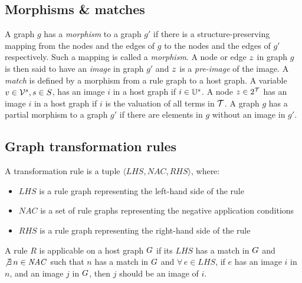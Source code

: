 \subsection{Morphisms \& matches}
A graph $g$ has a \textit{morphism} to a graph $g'$ if there is a structure-preserving mapping from the nodes and the edges of $g$ to the nodes and the edges of $g'$ respectively. Such a mapping is called a \textit{morphism}. A node or edge $z$ in graph $g$ is then said to have an \textit{image} in graph $g'$ and $z$ is a \textit{pre-image} of the image. A \textit{match} is defined by a morphism from a rule graph to a host graph. A variable $v \in \mathcal{V}^{s}, s \in S$, has an image $i$ in a host graph if $i \in \mathbb{U}^{s}$. A node $z \in 2^{\mathcal{T}}$ has an image $i$ in a host graph if $i$ is the valuation of all terms in $\mathcal{T}$. A graph $g$ has a partial morphism to a graph $g'$ if there are elements in $g$ without an image in $g'$.

\subsection{Graph transformation rules}\label{sec:graph_rules}
\vspace{5px}
\begin{definition}
A transformation rule is a tuple $\langle \mathit{LHS}, \mathit{NAC}, \mathit{RHS}\rangle$, where:
\begin{itemize}
  \item $\mathit{LHS}$ is a rule graph representing the left-hand side of the rule
  \item $\mathit{NAC}$ is a set of rule graphs representing the negative application conditions
  \item $\mathit{RHS}$ is a rule graph representing the right-hand side of the rule
\end{itemize}
\end{definition}

\begin{comment}\begin{definition}
$\mathit{LHS}$ is a tuple $\langle \mathcal{V}_{LHS}, \mathcal{E}_{LHS}, \mathcal{O}_{LHS} \rangle$, where $\mathcal{O}_{LHS} \subseteq \mathcal{V}^n \times O_p \times \mathcal{V}$.
\end{definition}\end{comment}

A rule $R$ is applicable on a host graph $G$ if its $\mathit{LHS}$ has a match in $G$ and $\not\exists\,n \in \mathit{NAC}$ such that $n$ has a match in $G$ and $\forall\,e \in \mathit{LHS}$, if $e$ has an image $i$ in $n$, and an image $j$ in $G$, then $j$ should be an image of $i$.

